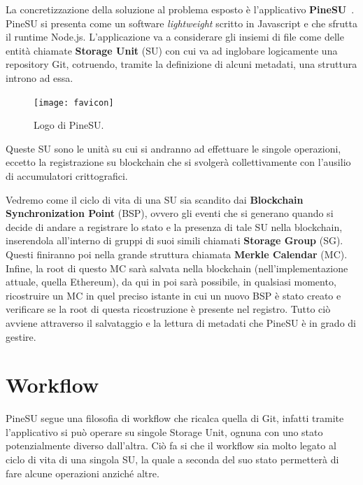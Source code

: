 
La concretizzazione della soluzione al problema esposto è l'applicativo \textbf{PineSU}~\cite{pinesu-github-21}. \\
PineSU si presenta come un software \emph{lightweight} scritto in Javascript e che sfrutta il runtime Node.js.
L'applicazione va a considerare gli insiemi di file come delle entità chiamate
\textbf{Storage Unit} (SU) con cui va ad inglobare logicamente una repository Git, cotruendo,
tramite la definizione di alcuni metadati, una struttura introno ad essa.
\begin{figure}
    \vspace{-20pt}
    \begin{center}
        \texttt{[image: favicon]}
        \caption{\small{
        Logo di PineSU.
        } %
        } %
    \end{center}
    \vspace{-10pt}
\end{figure}
Queste SU sono le unità su cui si andranno ad effettuare le singole
operazioni, eccetto la registrazione su blockchain che si svolgerà collettivamente con l'ausilio di accumulatori crittografici. 

Vedremo come il ciclo di vita di una SU sia scandito dai \textbf{Blockchain Synchronization Point} (BSP),
ovvero gli eventi che si generano quando si decide di andare a registrare lo stato e la presenza di tale SU nella blockchain, inserendola
all'interno di gruppi di suoi simili chiamati \textbf{Storage Group} (SG). Questi finiranno poi nella grande struttura chiamata \textbf{Merkle Calendar} (MC).
Infine, la root di questo MC sarà salvata nella blockchain (nell'implementazione attuale, quella Ethereum), da qui in poi sarà possibile, in qualsiasi momento, ricostruire un MC in quel preciso istante in cui un nuovo BSP è stato creato e verificare se la root di questa ricostruzione è presente nel registro.
Tutto ciò avviene attraverso il salvataggio e la lettura di metadati che PineSU è in grado di gestire.

\section{Workflow}
\label{sec:work}

PineSU segue una filosofia di workflow che ricalca quella di Git,
infatti tramite l'applicativo si può operare su singole Storage Unit, ognuna con uno stato potenzialmente
diverso dall'altra. Ciò fa si che il workflow sia molto legato al ciclo di vita di una singola SU, la quale
a seconda del suo stato permetterà di fare alcune operazioni anziché altre.

